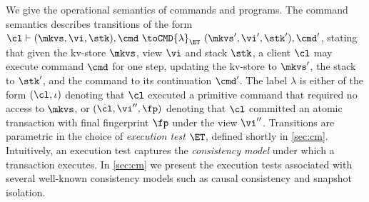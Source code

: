 We give the operational semantics of commands and programs. 
The command semantics describes transitions of the form
$\cl \vdash (\mkvs, \vi, \stk), \cmd \ \toCMD{\lambda}_{\ET} \ (\mkvs', \vi', \stk') ,
\cmd'$, stating that given the kv-store $\mkvs$, view $\vi$ and stack $\stk$, 
a client $\cl$ may execute command $\cmd$ for one step, updating 
the kv-store to $\mkvs'$, the stack to $\stk'$, and the command to its continuation $\cmd'$.
The label $\lambda$ is either of the form $(\cl, \iota)$ denoting that $\cl$ executed a primitive command
that required no access to $\mkvs$, 
or $(\cl, \vi'', \fp)$ denoting that $\cl$ committed an atomic transaction with final fingerprint $\fp$ under the view $\vi''$.
Transitions are parametric in the choice of \emph{execution test} $\ET$, defined shortly in \cref{sec:cm}.
Intuitively, an execution test captures the \emph{consistency model} under which a transaction executes.
In \cref{sec:cm} we present the execution tests associated with several well-known consistency models
such as causal consistency and snapshot isolation.

